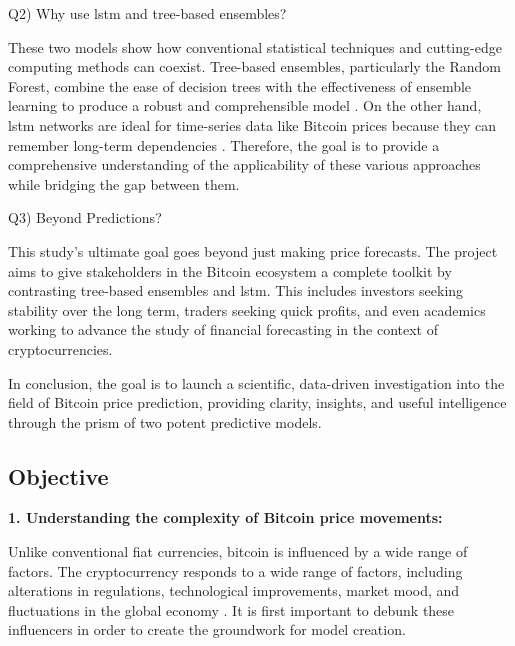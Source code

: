 \smallskip

Q2)	Why use \gls{lstm} and tree-based ensembles?

\smallskip

These two models show how conventional statistical techniques and cutting-edge computing methods can coexist. Tree-based ensembles, particularly the Random Forest, combine the ease of decision trees with the effectiveness of ensemble learning to produce a robust and comprehensible model \citep{liaw2002classification}. On the other hand, \gls{lstm} networks are ideal for time-series data like Bitcoin prices because they can remember long-term dependencies \citep{Hochreiter1997LongSM}. Therefore, the goal is to provide a comprehensive understanding of the applicability of these various approaches while bridging the gap between them.

\smallskip


Q3)	Beyond Predictions? 

\smallskip

This study's ultimate goal goes beyond just making price forecasts. The project aims to give stakeholders in the Bitcoin ecosystem a complete toolkit by contrasting tree-based ensembles and \gls{lstm}. This includes investors seeking stability over the long term, traders seeking quick profits, and even academics working to advance the study of financial forecasting in the context of cryptocurrencies.

\smallskip


In conclusion, the goal is to launch a scientific, data-driven investigation into the field of Bitcoin price prediction, providing clarity, insights, and useful intelligence through the prism of two potent predictive models.


\goodbreak
\subsection{Objective}

   \textbf{1. Understanding the complexity of Bitcoin price movements: }

\smallskip

Unlike conventional fiat currencies, bitcoin is influenced by a wide range of factors. The cryptocurrency responds to a wide range of factors, including alterations in regulations, technological improvements, market mood, and fluctuations in the global economy \citep{BARIVIERA20171}. It is first important to debunk these influencers in order to create the groundwork for model creation.

